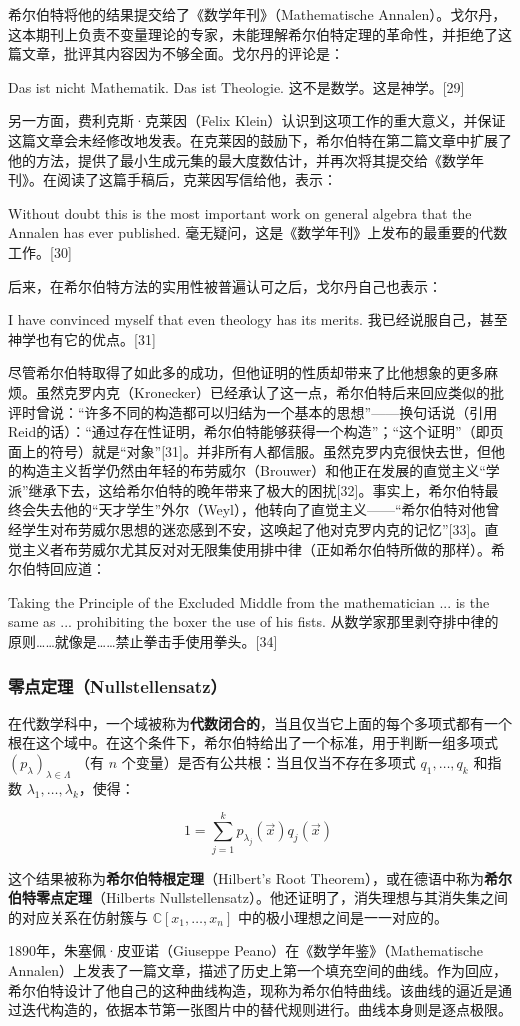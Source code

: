 希尔伯特将他的结果提交给了《数学年刊》（Mathematische Annalen）。戈尔丹，这本期刊上负责不变量理论的专家，未能理解希尔伯特定理的革命性，并拒绝了这篇文章，批评其内容因为不够全面。戈尔丹的评论是：

Das ist nicht Mathematik. Das ist Theologie.  
这不是数学。这是神学。[29]

另一方面，费利克斯·克莱因（Felix Klein）认识到这项工作的重大意义，并保证这篇文章会未经修改地发表。在克莱因的鼓励下，希尔伯特在第二篇文章中扩展了他的方法，提供了最小生成元集的最大度数估计，并再次将其提交给《数学年刊》。在阅读了这篇手稿后，克莱因写信给他，表示：

Without doubt this is the most important work on general algebra that the Annalen has ever published.  
毫无疑问，这是《数学年刊》上发布的最重要的代数工作。[30]

后来，在希尔伯特方法的实用性被普遍认可之后，戈尔丹自己也表示：

I have convinced myself that even theology has its merits. 
我已经说服自己，甚至神学也有它的优点。[31]

尽管希尔伯特取得了如此多的成功，但他证明的性质却带来了比他想象的更多麻烦。虽然克罗内克（Kronecker）已经承认了这一点，希尔伯特后来回应类似的批评时曾说：“许多不同的构造都可以归结为一个基本的思想”——换句话说（引用Reid的话）：“通过存在性证明，希尔伯特能够获得一个构造”；“这个证明”（即页面上的符号）就是“对象”[31]。并非所有人都信服。虽然克罗内克很快去世，但他的构造主义哲学仍然由年轻的布劳威尔（Brouwer）和他正在发展的直觉主义“学派”继承下去，这给希尔伯特的晚年带来了极大的困扰[32]。事实上，希尔伯特最终会失去他的“天才学生”外尔（Weyl），他转向了直觉主义——“希尔伯特对他曾经学生对布劳威尔思想的迷恋感到不安，这唤起了他对克罗内克的记忆”[33]。直觉主义者布劳威尔尤其反对对无限集使用排中律（正如希尔伯特所做的那样）。希尔伯特回应道：

Taking the Principle of the Excluded Middle from the mathematician ... is the same as ... prohibiting the boxer the use of his fists.
从数学家那里剥夺排中律的原则……就像是……禁止拳击手使用拳头。[34]
\subsubsection{零点定理（Nullstellensatz）}
在代数学科中，一个域被称为\textbf{代数闭合的}，当且仅当它上面的每个多项式都有一个根在这个域中。在这个条件下，希尔伯特给出了一个标准，用于判断一组多项式 \((p_{\lambda})_{\lambda \in \Lambda}\) （有 \(n\) 个变量）是否有公共根：当且仅当不存在多项式 \(q_1, \dots, q_k\) 和指数 \(\lambda_1, \dots, \lambda_k\)，使得：

\[
1 = \sum_{j=1}^{k} p_{\lambda_j}(\vec{x}) q_j(\vec{x})~
\]

这个结果被称为\textbf{希尔伯特根定理}（Hilbert's Root Theorem），或在德语中称为\textbf{希尔伯特零点定理}（Hilberts Nullstellensatz）。他还证明了，消失理想与其消失集之间的对应关系在仿射簇与 \( \mathbb{C}[x_1, \dots, x_n] \) 中的极小理想之间是一一对应的。


1890年，朱塞佩·皮亚诺（Giuseppe Peano）在《数学年鉴》（Mathematische Annalen）上发表了一篇文章，描述了历史上第一个填充空间的曲线。作为回应，希尔伯特设计了他自己的这种曲线构造，现称为希尔伯特曲线。该曲线的逼近是通过迭代构造的，依据本节第一张图片中的替代规则进行。曲线本身则是逐点极限。